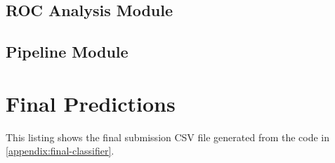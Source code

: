 \documentclass[journal]{IEEEtran}
\begin{document}


\subsection{ROC Analysis Module}


\subsection{Pipeline Module}


\section{Final Predictions}
This listing shows the final submission CSV file generated from the code in \ref{appendix:final-classifier}. 




%
%


\ifCLASSOPTIONcaptionsoff
  \newpage
\fi





%
%
%
\end{document}
